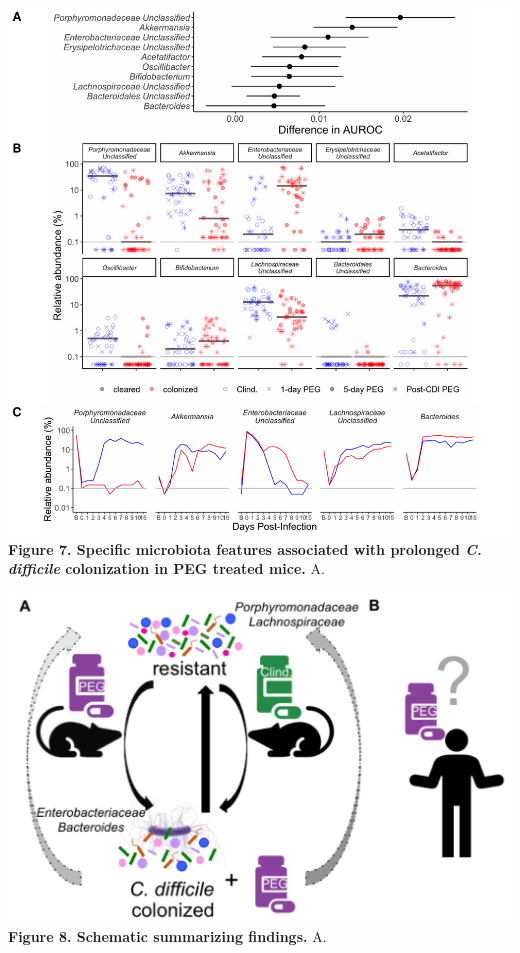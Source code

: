 \documentclass[
  11pt,
]{article}
\begin{document}
\includegraphics{figure_7.pdf} \textbf{Figure 7. Specific microbiota
features associated with prolonged \emph{C. difficile} colonization in
PEG treated mice.} A. \newpage

\includegraphics{figure_8.pdf} \textbf{Figure 8. Schematic summarizing
findings.} A. \newpage
\end{document}

